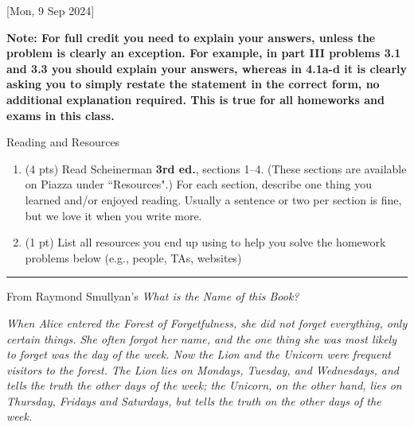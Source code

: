 [\due Mon,  9 Sep 2024] 

\textbf{\color{blue} Note: For full credit you need to explain your answers, unless the problem is clearly an exception.  For example, in part III problems 3.1 and 3.3 you should explain your answers, whereas in 4.1a-d it is clearly asking you to simply restate the statement in the correct form, no additional explanation required.  This is true for all homeworks and exams in this class.}

\bigskip
\bigskip

 Reading and Resources

\begin{enumerate}

\item (4 pts) Read Scheinerman \textbf{3rd ed.}, sections 1--4.  (These sections are available on Piazza under ``Resources".)  For each section, describe one thing you learned and/or enjoyed reading.  Usually a sentence or two per section is fine, but we love it when you write more.  

\item (1 pt) List all resources you end up using to help you solve the homework problems below (e.g., people, TAs, websites)

\end{enumerate}

\bigskip
\hrule
\bigskip

From Raymond Smullyan's \textit{What is the Name of this Book?}

{\em When Alice entered the Forest of Forgetfulness, she did not forget everything, only certain things. She often forgot her name, and the one thing she was most likely to forget was the day of the week. Now the Lion and the Unicorn were frequent visitors to the forest. The Lion lies on Mondays, Tuesday, and Wednesdays, and tells the truth the other days of the week; the Unicorn, on the other hand, lies on Thursday, Fridays and Saturdays, but tells the truth on the other days of the week.\/}


